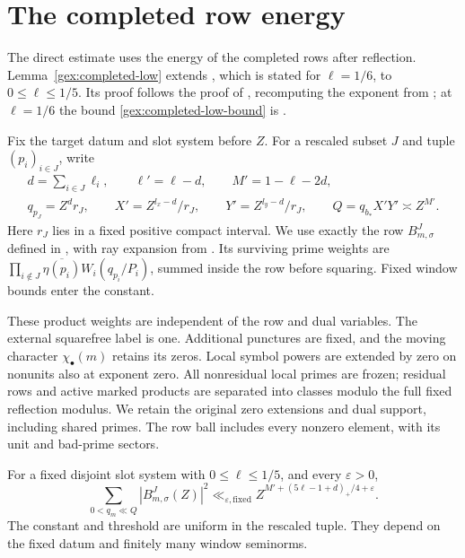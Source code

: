 \section{The completed row energy}
\label{gex:row-energy}

The direct estimate uses the energy of the completed rows after
reflection. Lemma~\ref{gex:completed-low} extends
\cite[Lemma~15.1]{OAI26}, which is stated for \(\ell=1/6\), to
\(0\le\ell\le1/5\). Its proof follows the proof of
\cite[Lemma~15.1]{OAI26}, recomputing the exponent from
\cite[Lemma~14.3]{OAI26}; at \(\ell=1/6\) the bound
\eqref{gex:completed-low-bound} is \cite[(15.2)]{OAI26}.

Fix the target datum and slot system before \(Z\).  For a rescaled
subset \(J\) and tuple \((p_i)_{i\in J}\), write
\begin{equation}
\begin{gathered}
 d=\sum_{i\in J}\ell_i,\qquad \ell'=\ell-d,\qquad M'=1-\ell-2d,\\
 q_{p_J}=Z^dr_J,\qquad
 X'=Z^{l_x-d}/r_J,\qquad Y'=Z^{l_y-d}/r_J,\qquad
 Q=q_{b_*}X'Y'\asymp Z^{M'}.
\end{gathered}
\label{gex:rescaled-low-scales}
\end{equation}
Here \(r_J\) lies in a fixed positive compact interval.  We use exactly
the row \(B_{m,\sigma}^{J}\) defined in \cite[\S15.1]{OAI26}, with
ray expansion from \cite[\S6]{OAI26}.  Its surviving prime weights are
\(\prod_{i\notin J}\overline{\eta(p_i)}W_i(q_{p_i}/P_i)\), summed
inside the row before squaring.  Fixed window bounds enter the constant.

These product weights are independent of the row and dual variables.
The external squarefree label is one.  Additional punctures are fixed,
and the moving character \(\chi_\bullet(m)\) retains its zeros.
Local symbol powers are extended by zero on nonunits also at exponent
zero.  All nonresidual local primes are frozen; residual rows
and active marked products are separated into classes modulo the full
fixed reflection modulus.  We retain the original zero extensions and
dual support, including shared primes.  The row ball includes every
nonzero element, with its unit and bad-prime sectors.

\begin{lemma}
\label{gex:completed-low}
For a fixed disjoint slot system with \(0\le\ell\le1/5\), and every
\(\varepsilon>0\),
\begin{equation}
 \sum_{0<q_m\ll Q}|B_{m,\sigma}^{J}(Z)|^2
 \ll_{\varepsilon,\mathrm{fixed}}
 Z^{M'+(5\ell-1+d)_+/4+\varepsilon}.
\label{gex:completed-low-bound}
\end{equation}
The constant and threshold are uniform in the rescaled tuple.
They depend on the fixed datum and finitely many window seminorms.
\end{lemma}

